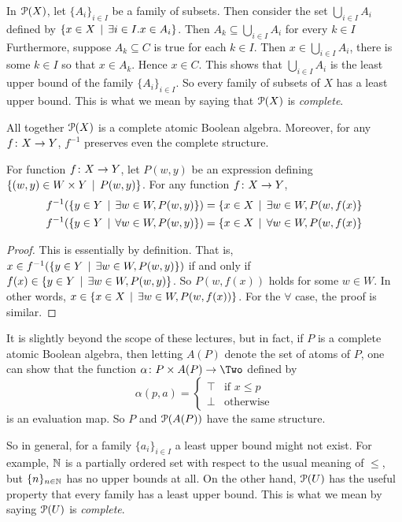 In ${\mathcal{P}}(X)$, let $\{A_i\}_{i\in I}$ be a family of subsets.
Then consider the set $\bigcup_{i\in I}A_i $ defined by $\{x\in X\,\mid\, \exists i\in I. x\in A_i\}$. Then $A_k\subseteq \bigcup_{i\in I}A_i$ for every $k\in I$
Furthermore, suppose $A_k\subseteq C$ is true for each $k\in I$.
Then $x\in \bigcup_{i\in I}A_i$, there is some $k\in I$ so that $x\in A_k$.
Hence $x\in C$.
This shows that $\bigcup_{i\in I}A_i$ is the least upper bound of the family $\{A_i\}_{i\in I}$.
So every family of subsets of $X$ has a least upper bound.
This is what we mean by saying that ${\mathcal{P}}(X)$ is \emph{complete}.

All together ${\mathcal{P}}(X)$ is a complete atomic Boolean algebra. Moreover,
for any ${f}\colon{X}\to{Y}$, 
$f^{-1}$ preserves even the complete structure.

\begin{lemma}
	For function ${f}\colon{X}\to{Y}$, let $P(w,y)$ be an expression defining
	$\{(w,y)\in W\times Y\,\mid\, P(w,y)\}$. For any function ${f}\colon{X}\to{Y}$,
	\begin{align*}
		f^{-1}(\{y\in Y\,\mid\, \exists w\in W, P(w,y)\}) &= \{x\in X\,\mid\, \exists w\in W, P(w,f(x)\}\\
		f^{-1}(\{y\in Y\,\mid\, \forall w\in W, P(w,y)\}) &= \{x\in X\,\mid\, \forall w\in W, P(w,f(x)\}\\
	\end{align*}
	
	\begin{proof}
		This is essentially by definition. That is, $x\in f^{-1}(\{y\in Y\,\mid\, \exists w\in W, P(w,y)\})$ if and only if $f(x)\in \{y\in Y\,\mid\, \exists w\in W,P(w,y)\}$. So $P(w,f(x))$ holds for some $w\in W$. In other words, 
		$x\in \{x\in X\,\mid\, \exists w\in W,P(w,f(x))\}$.
		For the $\forall$ case, the proof is similar.
	\end{proof} 
\end{lemma}
 
It is slightly beyond the scope of these lectures, but in fact, if $P$ is
a complete atomic Boolean algebra, then letting $A(P)$ denote the set of atoms of $P$, one can show that the function $\fromto \alpha {P\times A(P)}\Two$ defined 
by \[\alpha(p,a) = \begin{cases}
\top & \text{if $x\leq p$}\\
\bot & \text{otherwise}
\end{cases}
\]
is an evaluation map. So $P$ and ${\mathcal{P}}(A(P))$ have the same structure. 

So in general, for a family $\{a_i\}_{i\in I}$ a least upper bound might not exist.
For example, $\mathbb N$ is a partially ordered set with respect to the usual meaning of $\leq$, but $\{n\}_{n\in \mathbb N}$ has no upper bounds at all.
On the other hand, ${\mathcal{P}}(U)$ has the useful property that every family has a least upper bound.
This is what we mean by saying ${\mathcal{P}}(U)$ is \emph{complete}. 

